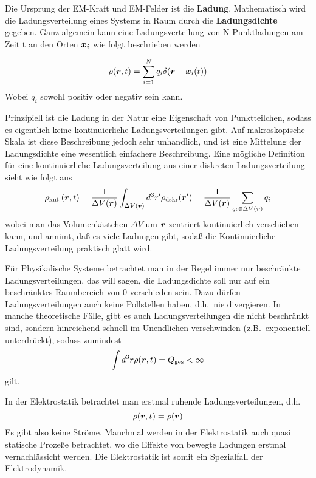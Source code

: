 Die Ursprung der EM-Kraft und EM-Felder ist die \textbf{Ladung}. Mathematisch wird die
Ladungsverteilung eines Systems in Raum durch die \textbf{Ladungsdichte} 
gegeben. Ganz algemein
kann eine Ladungsverteilung von N Punktladungen am Zeit t an den Orten $\vb*x_i$ wie folgt beschrieben werden

\begin{equation}
  \rho(\vb*r, t)= \sum_{i=1}^N q_i \delta(\vb*r - \vb*x_i(t))
\end{equation}
Wobei $q_i$ sowohl positiv oder negativ sein kann.

Prinzipiell ist die Ladung in der Natur eine Eigenschaft von Punktteilchen,
sodass es eigentlich keine kontinuierliche Ladungsverteilungen gibt. Auf
makroskopische Skala ist diese Beschreibung jedoch sehr unhandlich, und ist
eine Mittelung der Ladungsdichte eine wesentlich einfachere Beschreibung.
Eine mögliche Definition für eine kontinuierliche Ladungsverteilung aus einer
diskreten Ladungsverteilung sieht wie folgt aus
\begin{equation}
  \rho_{\textrm{knt.}}(\vb*r, t) 
  = 
  \frac{1}{\Delta V(\vb*r)} 
  \int_{\Delta V(\vb*r)}d^3r'\rho_{\text{dskr}}(\vb*r')
  = 
  \frac{1}{\Delta V(\vb*r)} 
  \sum_{q_i\in\Delta V(\vb*r)}q_i
\end{equation}
wobei man das Volumenkästchen $\Delta V$ um $\vb*r$ zentriert kontinuierlich verschieben kann, und annimt, daß es viele Ladungen gibt, sodaß die Kontinuierliche Ladungsverteilung praktisch glatt wird.

Für Physikalische Systeme betrachtet man in der Regel immer nur beschränkte 
Ladungsverteilungen, das will sagen, die Ladungsdichte soll nur auf 
ein beschränktes Raumbereich von 0 verschieden sein. 
Dazu dürfen Ladungsverteilungen auch keine Pollstellen haben, 
d.h.\ nie divergieren. 
In manche theoretische Fälle, gibt es auch Ladungsverteilungen die 
nicht beschränkt sind, sondern hinreichend schnell im Unendlichen 
verschwinden (z.B.\ exponentiell unterdrückt), sodass zumindest
\begin{equation*}
  \int d^3r \rho(\vb*r, t) = Q_\textrm{ges} < \infty
\end{equation*}
gilt.

In der Elektrostatik betrachtet man erstmal ruhende Ladungsverteilungen, 
d.h.
\begin{equation}
  \rho(\vb*r, t) = \rho(\vb*r)
\end{equation}
Es gibt also keine Ströme. Manchmal werden in der Elektrostatik auch 
quasi statische Prozeße betrachtet, wo die Effekte von bewegte Ladungen 
erstmal vernachlässicht werden. Die Elektrostatik ist somit ein Spezialfall
der Elektrodynamik.
